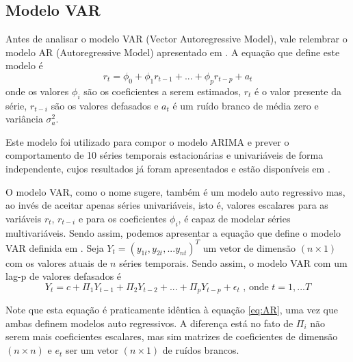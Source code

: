 \documentclass[12pt]{article}
\begin{document}
	\subsection{Modelo VAR}
	
	Antes de analisar o modelo VAR \textrm{(Vector Autoregressive Model)}, vale relembrar o modelo AR \textrm{(Autoregressive Model)} apresentado em \cite{Tsay}. A equação que define este modelo é
	\begin{equation}\label{eq:AR}
		r_t=\phi_0+\phi_1r_{t-1}+...+\phi_pr_{t-p}+a_t
	\end{equation}
	onde os valores $\phi_i$ são os coeficientes a serem estimados, $r_t$ é o valor presente da série, $r_{t-i}$ são os valores defasados e ${a_t}$ é um ruído branco de média zero e variância $\sigma^2_a$. 
	
	Este modelo foi utilizado para compor o modelo ARIMA e prever o comportamento de 10 séries temporais estacionárias e univariáveis de forma independente, cujos resultados já foram apresentados e estão disponíveis em \cite{git}.
	
	O modelo VAR, como o nome sugere, também é um modelo auto regressivo mas, ao invés de aceitar apenas séries univariáveis, isto é, valores escalares para as variáveis $r_t$, $r_{t-i}$ e para os coeficientes $\phi_i$, é capaz de modelar séries multivariáveis. Sendo assim, podemos apresentar a equação que define o modelo VAR definida em \cite{VAR}. Seja $Y_t=(y_{1t},y_{2t},...y_{nt})^T$ um vetor de dimensão $(n\times 1)$ com os valores atuais de $n$ séries temporais. Sendo assim, o modelo VAR com um \textrm{lag-p} de valores defasados é
	\begin{equation}\label{eq:VAR}
		Y_t=c+\Pi_1Y_{t-1}+\Pi_2Y_{t-2}+...+\Pi_pY_{t-p}+\epsilon_t\mbox{  , onde }t=1,...T
	\end{equation}

	Note que esta equação é praticamente idêntica à equação \ref{eq:AR}, uma vez que ambas definem modelos auto regressivos. A diferença está no fato de $\Pi_i$ não serem mais coeficientes escalares, mas sim matrizes de coeficientes de dimensão $(n\times n)$ e $e_t$ ser um vetor $(n\times1)$ de ruídos brancos. 
	
\end{document}
